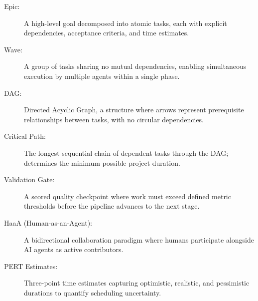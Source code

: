 \begin{glossarybox}
\begin{description}
\item[Epic:] A high-level goal decomposed into atomic tasks, each with explicit dependencies, acceptance criteria, and time estimates.
\item[Wave:] A group of tasks sharing no mutual dependencies, enabling simultaneous execution by multiple agents within a single phase.
\item[DAG:] Directed Acyclic Graph, a structure where arrows represent prerequisite relationships between tasks, with no circular dependencies.
\item[Critical Path:] The longest sequential chain of dependent tasks through the DAG; determines the minimum possible project duration.
\item[Validation Gate:] A scored quality checkpoint where work must exceed defined metric thresholds before the pipeline advances to the next stage.
\item[HaaA (Human-as-an-Agent):] A bidirectional collaboration paradigm where humans participate alongside AI agents as active contributors.
\item[PERT Estimates:] Three-point time estimates capturing optimistic, realistic, and pessimistic durations to quantify scheduling uncertainty.
\end{description}
\end{glossarybox}

\newpage
